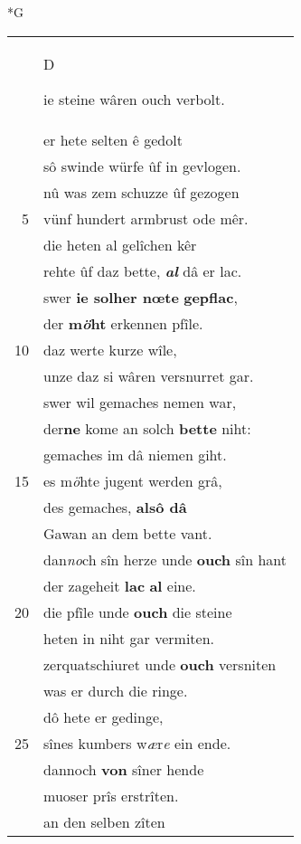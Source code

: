 \documentclass[8pt,a4paper,notitlepage]{article}
\begin{document}
\begin{table}[ht]
\begin{minipage}[t]{0.5\linewidth}
\small
\begin{center}*G
\end{center}
\begin{tabular}{rl}
 & \begin{large}D\end{large}ie steine wâren ouch verbolt.\\ 
 & er hete selten ê gedolt\\ 
 & sô swinde würfe ûf in gevlogen.\\ 
 & nû was zem schuzze ûf gezogen\\ 
5 & vünf hundert armbrust ode mêr.\\ 
 & die heten al gelîchen kêr\\ 
 & rehte ûf daz bette, \textit{\textbf{al}} dâ er lac.\\ 
 & swer \textbf{ie solher nœte} \textbf{gepflac},\\ 
 & der \textbf{m\textit{ö}ht} erkennen pfîle.\\ 
10 & daz werte kurze wîle,\\ 
 & unze daz si wâren versnurret gar.\\ 
 & swer wil gemaches nemen war,\\ 
 & der\textbf{ne} kome an solch \textbf{bette} niht:\\ 
 & gemaches im dâ niemen giht.\\ 
15 & es m\textit{ö}hte jugent werden grâ,\\ 
 & des gemaches, \textbf{alsô dâ}\\ 
 & Gawan an dem bette vant.\\ 
 & dan\textit{no}ch sîn herze unde \textbf{ouch} sîn hant\\ 
 & der zageheit \textbf{lac} \textbf{al} eine.\\ 
20 & die pfîle unde \textbf{ouch} die steine\\ 
 & heten in niht gar vermiten.\\ 
 & zerquatschiuret unde \textbf{ouch} versniten\\ 
 & was er durch die ringe.\\ 
 & dô hete er gedinge,\\ 
25 & sînes kumbers w\textit{æ}r\textit{e} ein ende.\\ 
 & dannoch \textbf{von} sîner hende\\ 
 & muoser prîs erstrîten.\\ 
 & an den selben zîten\\ 

\end{tabular}
\end{minipage}
\end{table}
\end{document}
